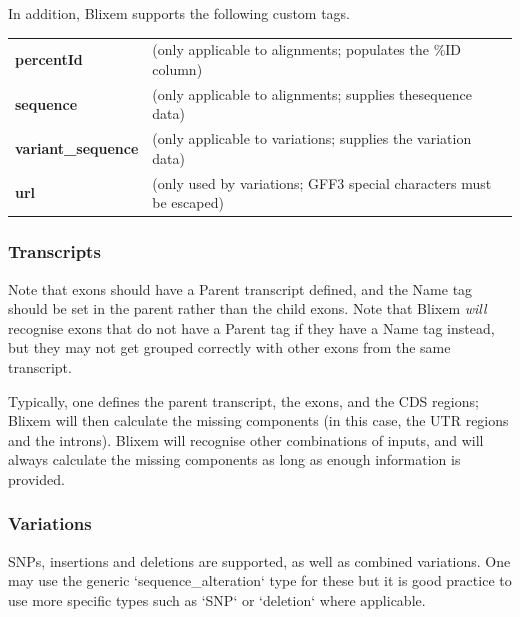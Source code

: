 \documentclass[letterpaper]{article}
\begin{document}
{In addition, Blixem supports the following custom tags.}
\begin{center}
\begin{supertabular}{p{2.802cm}p{10.704cm}} 
\textbf{percentId} & (only applicable to alignments; populates the \%ID column) \\
\textbf{sequence } & (only applicable to alignments; supplies thesequence data) \\
\textbf{variant\_sequence} & (only applicable to variations; supplies the variation data) \\
\textbf{url } & (only used by variations; GFF3 special characters must be escaped) \\
\end{supertabular}
\end{center}

{\color[rgb]{0.30980393,0.5058824,0.7411765}\subsubsection[Transcripts]{Transcripts}}

{Note that exons should have a Parent transcript defined, and the Name
tag should be set in the parent rather than the child exons. Note
that Blixem \textit{will} recognise exons that do not have a Parent tag
if they have a Name tag instead, but they may not get grouped correctly
with other exons from the same transcript.}

\bigskip

{Typically, one defines the parent transcript, the exons, and the CDS
regions; Blixem will then calculate the missing components (in this
case, the UTR regions and the introns). Blixem will recognise other
combinations of inputs, and will always calculate the missing
components as long as enough information is provided. }

\bigskip

{\color[rgb]{0.30980393,0.5058824,0.7411765}\subsubsection[Variations]{Variations}}

{SNPs, insertions and deletions are supported, as well as combined
variations. One may use the generic
{\textquoteleft}sequence\_alteration{\textquoteleft} type for these but
it is good practice to use more specific types such as
{\textquoteleft}SNP{\textquoteleft} or
{\textquoteleft}deletion{\textquoteleft} where applicable.}
\end{document}
